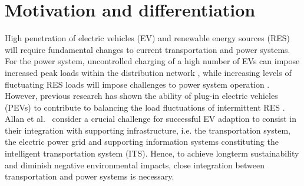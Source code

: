 \section{Motivation and differentiation}



High penetration of electric vehicles (EV) and renewable energy sources (RES) will require fundamental changes to current transportation and power systems. 
For the power system, uncontrolled charging of a high number of EVs can impose increased peak loads within the distribution network \cite{lopes2009identifying}, while increasing levels of fluctuating RES loads will impose challenges to power system operation \cite{heussen2012unified}. 
However, previous research has shown the ability of plug-in electric vehicles (PEVs) to contribute to balancing the load fluctuations of intermittent RES \cite{dallinger2012grid}. 
Allan et al.~\cite{allan2015benchmark} consider a crucial challenge for successful EV adaption to consist in their integration with supporting infrastructure, i.e. the transportation system, the electric power grid and supporting information systems constituting the intelligent transportation system (ITS). 
Hence, to achieve longterm sustainability and diminish negative environmental impacts, close integration between transportation and power systems is necessary.

